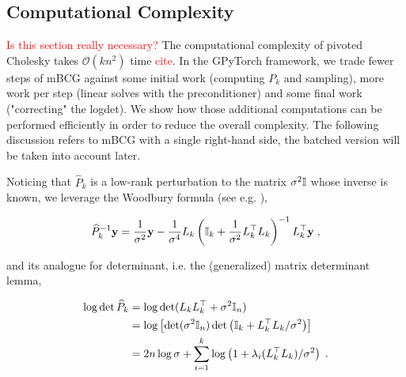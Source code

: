\documentclass{article}
\begin{document}
{\subsection{Computational Complexity}
\textcolor{red}{Is this section really necessary? }
The computational complexity of pivoted Cholesky takes $\mathcal O(kn^2)$ time \textcolor{red}{cite}. In the GPyTorch framework, we trade fewer steps of mBCG against some initial work (computing $P_k$ and sampling), more work per step (linear solves with the preconditioner) and some final work ("correcting" the logdet). We show how those additional computations can be performed efficiently in order to reduce the overall complexity. The following discussion refers to mBCG with a single right-hand side, the batched version will be taken into account later. 

Noticing that $\widehat P_k$ is a low-rank perturbation to the matrix $\sigma^2 \Id$ whose inverse is known, we leverage the Woodbury formula (see e.g. \cite{henderson_deriving_1981}),

\begin{equation} \label{eq:precond_linsolve}
    \widehat P_k^{-1} \vect y = \frac{1}{\sigma^2} \vect y - \frac{1}{\sigma^4} L_k \left( \Id[k] + \frac{1}{\sigma^2} L_k^\top L_k \right)^{-1}  L_k^\top \vect y \;,
\end{equation}

and its analogue for determinant, i.e. the (generalized) matrix determinant lemma,

\begin{align}
    \log \det \widehat P_k 
    &= \log \det( L_kL_k^\top + \sigma^2 \Id[n] ) \nonumber\\
    &= \log\left[ \det(\sigma^2 \Id[n]) \det \left( \Id[k] + L_k^\top L_k / \sigma^2 \right) \right] \nonumber\\
    &= 2n \log \sigma + \sum_{i=1}^k \log\left( 1 + \lambda_i(L_k^\top L_k) / \sigma^2 \right) \;. 
    \label{eq:precond_logdet}
\end{align}

}
\end{document}
